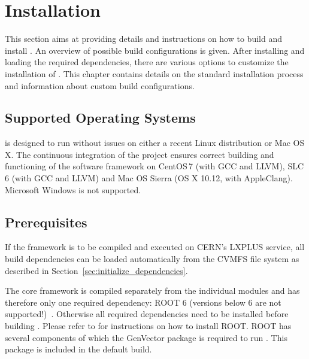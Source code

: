 \section{Installation}
\label{sec:installation}

This section aims at providing details and instructions on how to build and install \apsq.
An overview of possible build configurations is given.
After installing and loading the required dependencies, there are various options to customize the installation of \apsq.
This chapter contains details on the standard installation process and information about custom build configurations.

\subsection{Supported Operating Systems}
\label{sec:os}
\apsq is designed to run without issues on either a recent Linux distribution or Mac OS\,X.
The continuous integration of the project ensures correct building and functioning of the software framework on CentOS\,7 (with GCC and LLVM), SLC\,6 (with GCC and LLVM) and Mac OS Sierra (OS X 10.12, with AppleClang).
Microsoft Windows is not supported.

\subsection{Prerequisites}
\label{sec:prerequisites}
If the framework is to be compiled and executed on CERN's LXPLUS service, all build dependencies can be loaded automatically from the CVMFS file system as described in Section~\ref{sec:initialize_dependencies}.

The core framework is compiled separately from the individual modules and \apsq has therefore only one required dependency: ROOT 6 (versions below 6 are not supported!)~\cite{root}.
Otherwise all required dependencies need to be installed before building \apsq.
Please refer to \cite{rootinstallation} for instructions on how to install ROOT.
ROOT has several components of which the GenVector package is required to run \apsq.
This package is included in the default build.

